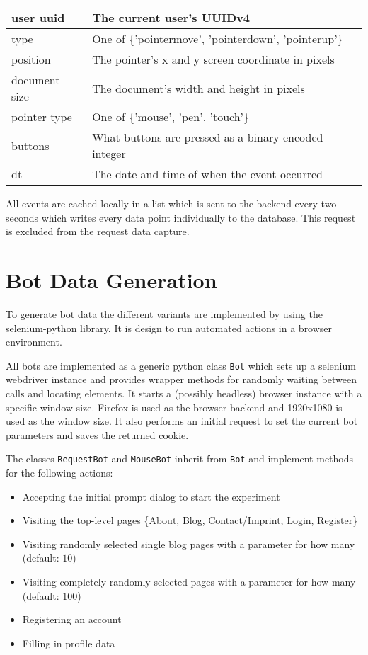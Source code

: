\documentclass[
    fontsize=12pt,
    headings=small,
    parskip=half,           %
    bibliography=totoc,
    numbers=noenddot,       %
    open=any,               %
    final                   %
]{scrreprt}
\begin{document}
\begin{table}[]
\begin{tabular}{|l|l|}
\hline
user uuid & The current user's UUIDv4 \\ \hline
type & One of \{'pointermove', 'pointerdown', 'pointerup'\} \\ \hline
position & The pointer's x and y screen coordinate in pixels \\ \hline
document size & The document's width and height in pixels \\ \hline
pointer type & One of \{'mouse', 'pen', 'touch'\} \\ \hline
buttons & What buttons are pressed as a binary encoded integer \\ \hline
dt & The date and time of when the event occurred \\ \hline

\end{tabular}
\end{table}

All events are cached locally in a list which is sent to the backend every two seconds which writes every data point individually to the database. This request is excluded from the request data capture.

\chapter{Bot Data Generation}

To generate bot data the different variants are implemented by using the selenium-python \cite{SELENIUMPYTHON} library. It is design to run automated actions in a browser environment.


All bots are implemented as a generic python class \lstinline{Bot} which sets up a selenium\cite{SELENIUMPYTHON} webdriver instance and provides wrapper methods for randomly waiting between calls and locating elements. It starts a (possibly headless) browser instance with a specific window size. Firefox is used as the browser backend and 1920x1080 is used as the window size. It also performs an initial request to set the current bot parameters and saves the returned cookie.


The classes \lstinline{RequestBot} and \lstinline{MouseBot} inherit from \lstinline{Bot} and implement methods for the following actions:

\begin{itemize}
	\item Accepting the initial prompt dialog to start the experiment
	\item Visiting the top-level pages \{About, Blog, Contact/Imprint, Login, Register\}
	\item Visiting randomly selected single blog pages with a parameter for how many (default: $10$)
	\item Visiting completely randomly selected pages with a parameter for how many (default: $100$)
	\item Registering an account
	\item Filling in profile data
\end{itemize}
\end{document}
